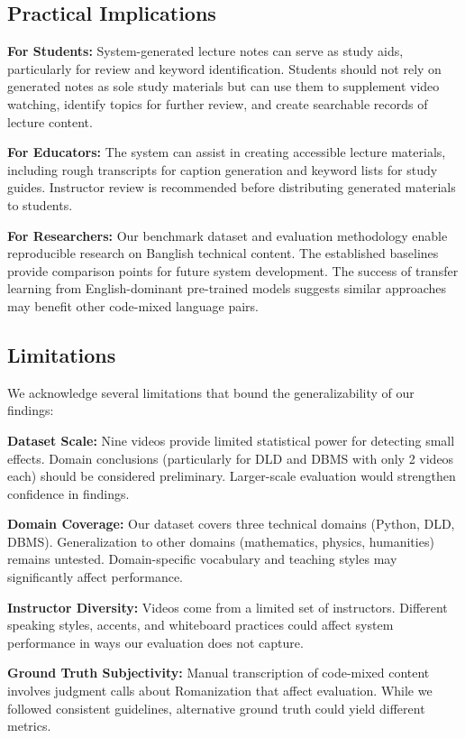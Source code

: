 \subsection{Practical Implications}

\textbf{For Students:} System-generated lecture notes can serve as study aids, particularly for review and keyword identification. Students should not rely on generated notes as sole study materials but can use them to supplement video watching, identify topics for further review, and create searchable records of lecture content.

\textbf{For Educators:} The system can assist in creating accessible lecture materials, including rough transcripts for caption generation and keyword lists for study guides. Instructor review is recommended before distributing generated materials to students.

\textbf{For Researchers:} Our benchmark dataset and evaluation methodology enable reproducible research on Banglish technical content. The established baselines provide comparison points for future system development. The success of transfer learning from English-dominant pre-trained models \cite{Pan2010} suggests similar approaches may benefit other code-mixed language pairs.

\subsection{Limitations}

We acknowledge several limitations that bound the generalizability of our findings:

\textbf{Dataset Scale:} Nine videos provide limited statistical power for detecting small effects. Domain conclusions (particularly for DLD and DBMS with only 2 videos each) should be considered preliminary. Larger-scale evaluation would strengthen confidence in findings.

\textbf{Domain Coverage:} Our dataset covers three technical domains (Python, DLD, DBMS). Generalization to other domains (mathematics, physics, humanities) remains untested. Domain-specific vocabulary and teaching styles may significantly affect performance.

\textbf{Instructor Diversity:} Videos come from a limited set of instructors. Different speaking styles, accents, and whiteboard practices could affect system performance in ways our evaluation does not capture.

\textbf{Ground Truth Subjectivity:} Manual transcription of code-mixed content involves judgment calls about Romanization that affect evaluation. While we followed consistent guidelines, alternative ground truth could yield different metrics.

